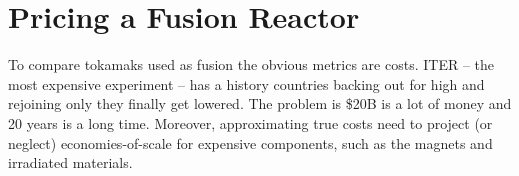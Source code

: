 %
%		
%
%

\section{Pricing a Fusion Reactor}

To  compare tokamaks used as fusion  the obvious metrics are costs. ITER -- the most expensive experiment  -- has a history  countries backing out for high  and rejoining only  they finally get lowered.\cite{jeff} The problem is \$20B is a lot of money and 20 years is a long time. Moreover, approximating true costs  need to project (or neglect)  economies-of-scale for expensive components, such as the  magnets and irradiated materials.

